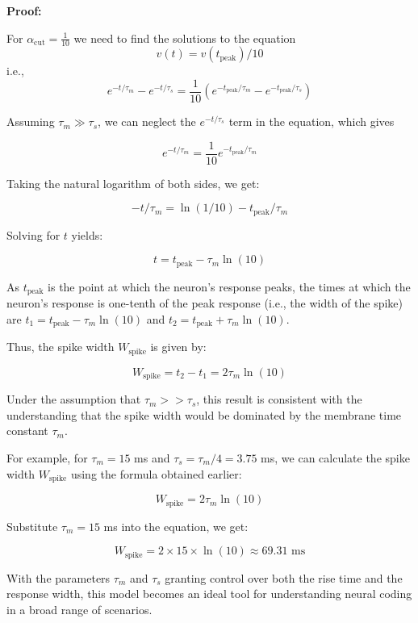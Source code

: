 \textbf{{Proof:}}

For $\alpha_{\text{{cut}}} = \frac{1}{10}$ we need to find the solutions to the equation
\begin{equation}
    v(t) = v(t_{\text{{peak}}})/10
\end{equation}
i.e.,
\begin{equation}
e^{-t/\tau_m} - e^{-t/\tau_s} = \frac{1}{10}\left(e^{-t_{\text{{peak}}}/\tau_m} - e^{-t_{\text{{peak}}}/\tau_s}\right)
\end{equation}

Assuming $\tau_m \gg \tau_s$, we can neglect the $e^{-t/\tau_s}$ term in the equation, which gives

\begin{equation}
e^{-t/\tau_m} = \frac{1}{10} e^{-t_{\text{{peak}}}/\tau_m}
\end{equation}

Taking the natural logarithm of both sides, we get:

\begin{equation}
-t/\tau_m = \ln(1/10) - t_{\text{{peak}}}/\tau_m
\end{equation}

Solving for $t$ yields:

\begin{equation}
t = t_{\text{{peak}}} - \tau_m \ln(10)
\end{equation}

As $t_{\text{{peak}}}$ is the point at which the neuron's response peaks, the times at which the neuron's response is one-tenth of the peak response (i.e., the width of the spike) are $t_1 = t_{\text{{peak}}} - \tau_m \ln(10)$ and $t_2 = t_{\text{{peak}}} + \tau_m \ln(10)$.

Thus, the spike width $W_{\text{{spike}}}$ is given by:

\begin{equation}
W_{\text{{spike}}} = t_2 - t_1 = 2\tau_m \ln(10)
\end{equation}

Under the assumption that $\tau_m >> \tau_s$, this result is consistent with the understanding that the spike width would be dominated by the membrane time constant $\tau_m$. 

For example, for $\tau_m = 15$ ms and $\tau_s = \tau_m / 4 = 3.75$ ms, we can calculate the spike width $W_{\text{{spike}}}$ using the formula obtained earlier:

\begin{equation}
W_{\text{{spike}}} = 2\tau_m \ln(10)
\end{equation}

Substitute $\tau_m = 15$ ms into the equation, we get:

\begin{equation}
W_{\text{{spike}}} = 2 \times 15 \times \ln(10) \approx 69.31 \text{ ms}
\end{equation}

With the parameters $\tau_m$ and $\tau_s$ granting control over both the rise time and the response width, this model becomes an ideal tool for understanding neural coding in a broad range of scenarios.
